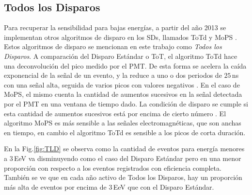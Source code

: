  
\subsection{Todos los Disparos}

Para recuperar la sensibilidad para bajas energías, a partir del año 2013  se implementan otros algoritmos de disparo en los SDs, llamados ToTd y MoPS \cite{pierre2013plans}. Estos algoritmos de disparo se mencionan en este trabajo como \textit{Todos los Disparos}. A comparación del Disparo Estándar o ToT, el algoritmo ToTd hace una deconvolución del pico medido por el PMT. De esta forma se acelera la caída exponencial de la señal de un evento, y la reduce a uno o dos periodos de  $25\,$ns con una señal alta, seguida de varios picos con valores negativos \cite{ToTd}. En el caso de MoPS, el mismo cuenta la  cantidad de aumentos sucesivos en la señal detectada por el PMT en una ventana de tiempo dado. La condición de disparo se cumple si esta cantidad de aumentos sucesivos está por encima de cierto número \cite{MoPS}. El algoritmo MoPS es más sensible a las señales electromagnéticas, que son anchas en tiempo, en cambio el algoritmo ToTd es sensible a los picos de corta duración.  


En la Fig.\ref{fig:TLD} se observa como la cantidad de eventos para energía menores a $3\,$EeV va disminuyendo como el caso del Disparo Estándar pero en una menor proporción con respecto a los eventos registrados con eficiencia completa. También se ve que en cada año activo de Todos los Disparos, hay un proporción más alta de eventos por encima de $3\,$EeV que con el Disparo Estándar.


